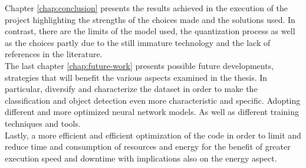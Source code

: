 Chapter \ref{chap:conclusion} presents the results achieved in the execution of 
the project highlighting the strengths of the choices made and the solutions
used.
In contrast, there are the limits of the model used, the quantization process as
well as the choices partly due to the still immature technology and the lack of
references in the literature.\\

\noindent The last chapter \ref{chap:future-work} presents possible future
developments, strategies that will benefit the various aspects examined in the
thesis.
In particular, diversify and characterize the dataset in order to make the
classification and object detection even more characteristic and specific.
Adopting different and more optimized neural network models. 
As well as different training techniques and tools.\\ 
Lastly, a more efficient and efficient optimization of the code in order to
limit and reduce time and consumption of resources and energy for the benefit of
greater execution speed and downtime with implications also on the energy
aspect.